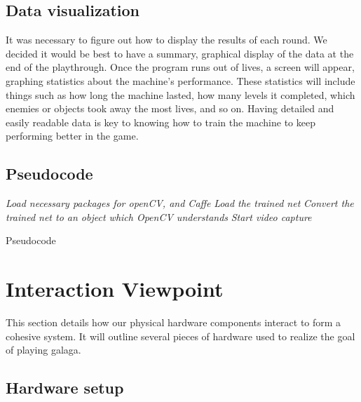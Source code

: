 \documentclass[onecolumn, draftclsnofoot,10pt, compsoc]{IEEEtran}
\begin{document}
\subsection{Data visualization}%

It was necessary to figure out how to display the results of each round.
We decided it would be best to have a summary, graphical display of the data at the end of the playthrough.
Once the program runs out of lives, a screen will appear, graphing statistics about the machine's performance.
These statistics will include things such as how long the machine lasted, how many levels it completed, which enemies or objects took away the most lives, and so on.
Having detailed and easily readable data is key to knowing how to train the machine to keep performing better in the game.


\newpage

\subsection{Pseudocode}\label{sssec:num3}%
\begin{algorithm}
  \emph{Load necessary packages for openCV, and Caffe}\;
  \emph{Load the trained net}\;
  \emph{Convert the trained net to an object which OpenCV understands}\;
  \emph{Start video capture}\;

    \caption{Pseudocode}
\end{algorithm}

\section{Interaction Viewpoint}\label{sssec:num1}%

This section details how our physical hardware components interact to form a cohesive system.
It will outline several pieces of hardware used to realize the goal of playing galaga.

\subsection{Hardware setup}%
\end{document}
